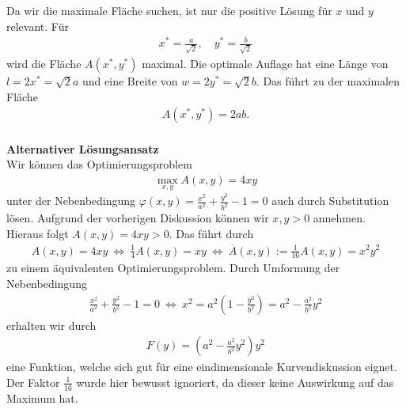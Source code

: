 Da wir die maximale Fläche suchen, ist nur die positive Lösung für $ x $ und $ y $ relevant. Für 
\begin{align*}
	x^\ast = \frac{a}{\sqrt{2}}, \quad y^\ast = \frac{b}{\sqrt{2}}
\end{align*}  
wird die Fläche $ A(x^\ast, y^\ast ) $ maximal. Die optimale Auflage hat eine Länge von $ l = 2 x^\ast = \sqrt{2} a  $ und eine Breite von $ w = 2 y^\ast = \sqrt{2} b  $.
Das führt zu der maximalen Fläche 
\begin{align*}
	A(x^\ast, y^\ast) = 2 ab.
\end{align*}
\ \\
\textbf{Alternativer Lösungsansatz}\\
Wir können das Optimierungsproblem
\begin{align*}
	\max \limits_{x,y} A(x,y) = 4 xy
\end{align*}
unter der Nebenbedingung $ \varphi(x,y) = \frac{x^2}{a^2} + \frac{y^2}{b^2} - 1 = 0$ auch durch Substitution lösen. Aufgrund der vorherigen Diskussion können wir $ x,y > 0 $ annehmen. Hieraus folgt $ A(x,y) = 4 xy > 0 $. Das führt durch
\begin{align*}
	A(x,y) = 4 xy \ \Leftrightarrow \
	\frac{1}{4} A(x,y) = xy
	\ \Leftrightarrow \
	\overline{A}(x,y) := \frac{1}{16}A(x,y) = x^2 y^2
\end{align*}
zu einem äquivalenten Optimierungsproblem. Durch Umformung der Nebenbedingung
\begin{align*}
	\frac{x^2}{a^2} + \frac{y^2}{b^2} - 1 = 0 
	\ \Leftrightarrow \
	x^2 = a^2\left(1 - \frac{y^2}{b^2} \right) = a^2 - \frac{a^2}{b^2} y^2
\end{align*}
erhalten wir durch
\begin{align*} 
	F(y) = \left(a^2 - \frac{a^2}{b^2} y^2\right) y^2
\end{align*}
eine Funktion, welche sich gut für eine eindimensionale Kurvendiskussion eignet. Der Faktor $ \frac{1}{16} $ wurde hier bewusst ignoriert, da dieser keine Auswirkung auf das Maximum hat.
\newpage
